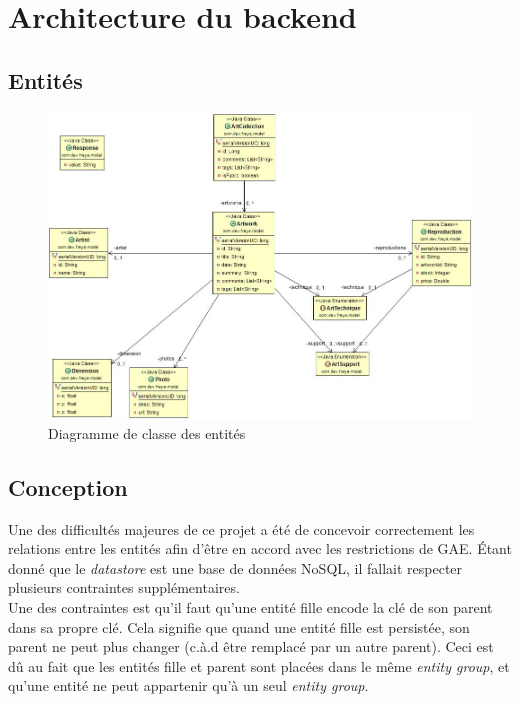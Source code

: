 \chapter{Architecture du backend}

\section{Entités}
\begin{figure}[h]
  \center
  \includegraphics[width=1.0\textwidth]{resources/model_diagram.jpg}
  \caption{Diagramme de classe des entités}
  \label{fig:model_diagram}
\end{figure}

\newpage
\section{Conception}
Une des difficultés majeures de ce projet a été de concevoir correctement les
relations entre les entités afin d’être en accord avec les restrictions de GAE.
Étant donné que le \emph{datastore} est une base de données NoSQL, il fallait
respecter plusieurs contraintes supplémentaires.\\

Une des contraintes est qu’il faut qu’une entité fille encode la clé de son
parent dans sa propre clé. Cela signifie que quand une entité fille est
persistée, son parent ne peut plus changer (c.à.d être remplacé par un autre
parent). Ceci est dû au fait que les entités fille et parent sont placées dans
le même \emph{entity group}, et qu’une entité ne peut appartenir qu’à un seul
\emph{entity group}.\\

